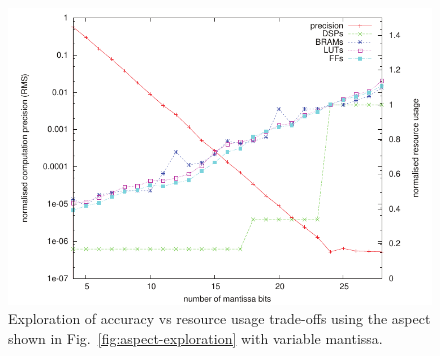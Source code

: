 \begin{figure}[!h]
\includegraphics[scale=0.7]{figs/pre}
\caption{Exploration of accuracy vs resource usage trade-offs using the aspect 
shown in Fig.~\ref{fig:aspect-exploration} with variable mantissa.}
\label{fig:precision}
\end{figure}

